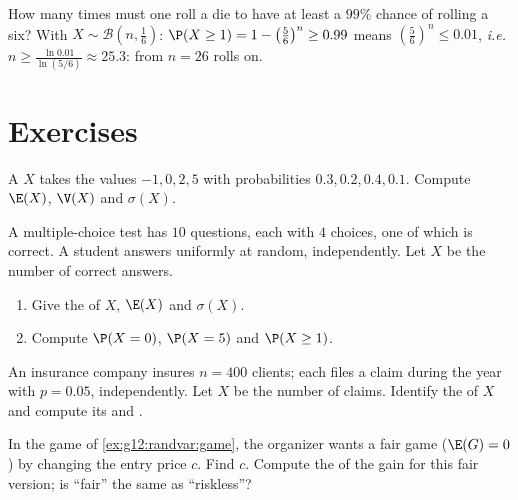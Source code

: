 \begin{example}\label{ex:g12:randvar:atleastone}
How many times must one roll a die to have at least a $99\%$ chance of
rolling a six? With $X \sim \mathcal B\left(n, \frac16\right)$:
$\P(X \geq 1) = 1 - \left(\frac56\right)^n \geq 0.99$ means
$\left(\frac56\right)^n \leq 0.01$, \emph{i.e.}
$n \geq \frac{\ln 0.01}{\ln(5/6)} \approx 25.3$: from $n = 26$ rolls on.
\end{example}

\section{Exercises}

\begin{exercise}[$\star$]\label{exo:g12:randvar:1}
A  $X$ takes the values $-1, 0, 2, 5$ with probabilities
$0.3, 0.2, 0.4, 0.1$. Compute $\E(X)$, $\V(X)$ and $\sigma(X)$.
\end{exercise}

\begin{exercise}[$\star$]\label{exo:g12:randvar:2}
A multiple-choice test has $10$ questions, each with $4$ choices, one of
which is correct. A student answers uniformly at random, independently.
Let $X$ be the number of correct answers.
\begin{enumerate}
  \item Give the  of $X$, $\E(X)$ and $\sigma(X)$.
  \item Compute $\P(X = 0)$, $\P(X = 5)$ and $\P(X \geq 1)$.
\end{enumerate}
\end{exercise}

\begin{exercise}[$\star$]\label{exo:g12:randvar:3}
An insurance company insures $n = 400$ clients; each files a claim during
the year with  $p = 0.05$, independently. Let $X$ be the number
of claims. Identify the  of $X$ and compute its  and
.
\end{exercise}

\begin{exercise}[$\star\star$]\label{exo:g12:randvar:4}
In the game of \cref{ex:g12:randvar:game}, the organizer wants a fair game
($\E(G) = 0$) by changing the entry price $c$. Find $c$. Compute the
 of the gain for this fair version; is ``fair'' the same as
``riskless''?
\end{exercise}

